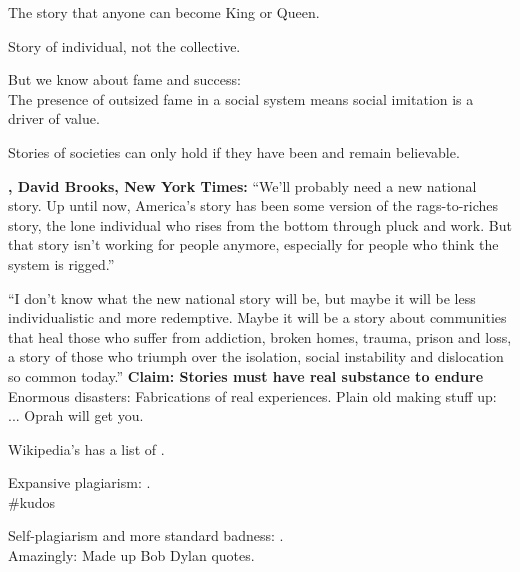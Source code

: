      The story that anyone can become King or Queen.
    
      Story of individual, not the collective.
    
      But we know about fame and success:\\
      {
        The presence of outsized fame in a social system
        means social imitation is a driver of value.
      }
    
      Stories of societies can only hold if they
      have been and remain believable.
  
  \textbf{, David Brooks, New York Times:}
    {
    ``We'll probably need a new national story. 
    }
    {
    Up until now, America's story has been some version of the rags-to-riches story, 
    }
    {
    the lone individual who rises from the
    }
    {
    bottom through pluck and work. 
    }
    {
    But that story isn't working for people anymore, 
    }
    {
    especially for people who think the system is rigged.''
    }

    \medskip
    {
      ``I don't know what the new national story will be, 
    }
    {
    but maybe it will be less individualistic and more redemptive. 
    }
    {
    Maybe it will be a story about communities that heal those who
    }
    {
    suffer 
    from addiction, broken homes, trauma, prison and loss, 
    }
    {
      a story of those who triumph over the isolation, 
      social instability and dislocation so common today.''
    }
  \textbf{Claim: Stories must have real substance to endure}
      Enormous disasters: Fabrications of real experiences.
        Plain old making stuff up:
        {
          ...  Oprah will get you.
        }
      
        Wikipedia's has a list of
        .
      
        Expansive plagiarism:
        . \\
        {
          \#kudos
        }
      
        Self-plagiarism and more standard badness:
        . \\
        {
          Amazingly: Made up Bob Dylan quotes.
        }
      
